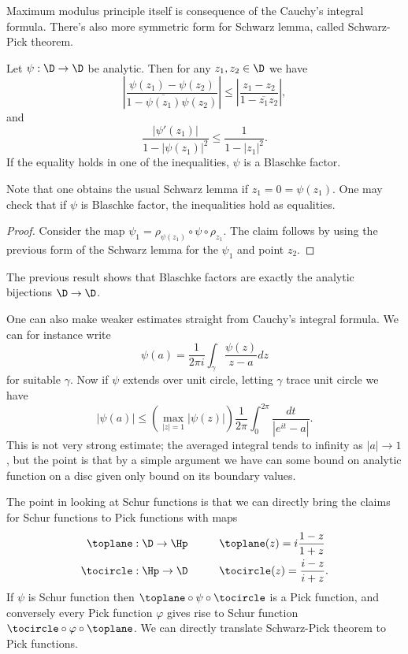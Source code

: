 Maximum modulus principle itself is consequence of the Cauchy's integral formula. There's also more symmetric form for Schwarz lemma, called Schwarz-Pick theorem.

\begin{lause}
	Let $\psi : \D \to \D$ be analytic. Then for any $z_{1}, z_{2} \in \D$ we have
	\[
		\left|\frac{\psi(z_{1}) - \psi(z_{2})}{1 - \overline{\psi(z_{1})} \psi(z_{2})} \right| \leq \left|\frac{z_{1} - z_{2}}{1 - \overline{z_{1}}z_{2}}\right|,
	\]
	and
	\[
		\frac{\left|\psi'(z_{1})\right|}{1 - |\psi(z_{1})|^2} \leq \frac{1}{1 - |z_{1}|^2}.
	\]
	If the equality holds in one of the inequalities, $\psi$ is a Blaschke factor.
\end{lause}

Note that one obtains the usual Schwarz lemma if $z_{1} = 0 = \psi(z_{1})$. One may check that if $\psi$ is Blaschke factor, the inequalities hold as equalities.
\begin{proof}
	Consider the map $\psi_{1} = \rho_{\psi(z_{1})} \circ \psi \circ \rho_{z_{1}}$. The claim follows by using the previous form of the Schwarz lemma for the $\psi_{1}$ and point $z_{2}$.
\end{proof}

The previous result shows that Blaschke factors are exactly the analytic bijections $\D \to \D$.

One can also make weaker estimates straight from Cauchy's integral formula. We can for instance write
\[
	\psi(a) = \frac{1}{2 \pi i}\int_{\gamma} \frac{\psi(z)}{z - a} dz
\]
for suitable $\gamma$. Now if $\psi$ extends over unit circle, letting $\gamma$ trace unit circle we have
\[
	|\psi(a)| \leq \left(\max_{|z| = 1} \left|\psi(z)\right| \right) \frac{1}{2 \pi}\int_{0}^{2 \pi} \frac{d t}{|e^{i t}  - a|}.
\]
This is not very strong estimate; the averaged integral tends to infinity as $|a| \to 1$, but the point is that by a simple argument we have can some bound on analytic function on a disc given only bound on its boundary values.

The point in looking at Schur functions is that we can directly bring the claims for Schur functions to Pick functions with maps
\begin{align*}
	\toplane : \D \to \Hp & \hspace{1cm} \toplane (z) = i \frac{1 - z}{1 + z} \\
	\tocircle : \Hp \to \D & \hspace{1cm} \tocircle (z) = \frac{i - z}{i + z}.
\end{align*}
If $\psi$ is Schur function then $\toplane \circ \psi \circ \tocircle$ is a Pick function, and conversely every Pick function $\varphi$ gives rise to Schur function $\tocircle \circ \varphi \circ \toplane$. We can directly translate Schwarz-Pick theorem to Pick functions.

